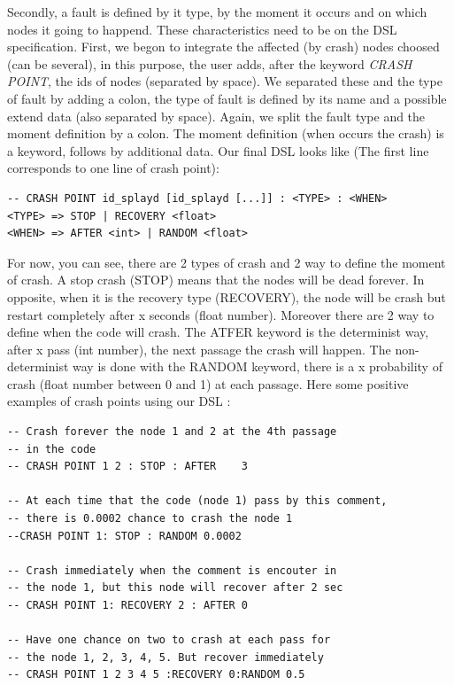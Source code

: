 \documentclass{eplmastersthesis}
\begin{document}
        Secondly, a fault is defined by it type, by the moment it occurs and on which nodes it going to happend.
        These characteristics need to be on the DSL specification. First, we begon to integrate the affected (by crash) nodes choosed
        (can be several), in this purpose, the user adds, after the keyword \textit{CRASH POINT}, 
        the ids of nodes (separated by space). We separated these and the type of fault by adding a colon, the type 
        of fault is defined by its name and a possible extend data (also separated by space). Again, we split the
        fault type and the moment definition by a colon. The moment definition (when occurs the crash) is a keyword, follows
        by additional data. Our final DSL looks like (The first line corresponds to one line of crash point): 
        \begin{lstlisting}
-- CRASH POINT id_splayd [id_splayd [...]] : <TYPE> : <WHEN> 
<TYPE> => STOP | RECOVERY <float>
<WHEN> => AFTER <int> | RANDOM <float>
        \end{lstlisting}
        For now, you can see, there are 2 types of crash and 2 way to define the moment of crash. A stop crash (STOP) means that
        the nodes will be dead forever. In opposite, when it is the recovery type (RECOVERY), the node will be crash but restart
        completely after x seconds (float number). Moreover there are 2 way to define when the code will crash. The ATFER keyword 
        is the determinist way, after x pass (int number), the next passage the crash will happen. The non-determinist way is
        done with the RANDOM keyword, there is a x probability of crash (float number between 0 and 1) at each passage. 
        Here some positive examples of crash points using our DSL :
        
        \begin{lstlisting}[style=lua]
-- Crash forever the node 1 and 2 at the 4th passage
-- in the code
-- CRASH POINT 1 2 : STOP : AFTER    3

-- At each time that the code (node 1) pass by this comment,
-- there is 0.0002 chance to crash the node 1
--CRASH POINT 1: STOP : RANDOM 0.0002

-- Crash immediately when the comment is encouter in 
-- the node 1, but this node will recover after 2 sec
-- CRASH POINT 1: RECOVERY 2 : AFTER 0

-- Have one chance on two to crash at each pass for 
-- the node 1, 2, 3, 4, 5. But recover immediately
-- CRASH POINT 1 2 3 4 5 :RECOVERY 0:RANDOM 0.5
          \end{lstlisting}
\end{document}
